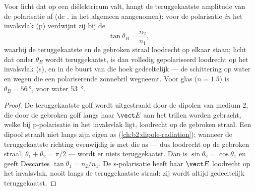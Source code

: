 \begin{proposition}\label{prop:b2:wave-interfaces:brewster}
Voor licht dat op een diëlektricum valt, hangt de teruggekaatste amplitude
van de polarisatie af (de , in het algemeen
aangenomen): voor de polarisatie \emph{in} het invalsvlak (p) verdwijnt zij
bij de \emph{}
\[
\tan\theta_B = \frac{n_2}{n_1} ,
\]
waarbij de teruggekaatste en de gebroken straal loodrecht op elkaar staan;
licht dat onder $\theta_B$ wordt teruggekaatst, is dan volledig
gepolariseerd loodrecht op het invalsvlak (s), en in de buurt van die hoek
gedeeltelijk --- de schittering op water en wegen die een polariserende
zonnebril wegneemt. Voor glas ($n = 1.5$) is $\theta_B = \qty{56}{\degree}$,
voor water \qty{53}{\degree}.
\end{proposition}

\begin{proof}
De teruggekaatste golf wordt uitgestraald door de dipolen van medium 2, die
door de gebroken golf langs haar $\vect E$ aan het trillen worden gebracht,
welke bij p-polarisatie in het invalsvlak ligt, loodrecht op de gebroken
straal. Een dipool straalt niet langs zijn eigen as
(\cref{ch:b2:dipole-radiation}); wanneer de teruggekaatste richting
evenwijdig is met die as --- dus loodrecht op de gebroken straal,
$\theta_1
+ \theta_2 = \pi/2$ --- wordt er niets teruggekaatst. Dan is
$\sin\theta_2 = \cos\theta_1$ en geeft Descartes $\tan\theta_1 = n_2/n_1$.
De s-polarisatie heeft haar $\vect E$ loodrecht op het invalsvlak, nooit
langs de teruggekaatste straal: zij wordt altijd gedeeltelijk teruggekaatst.
\end{proof}

